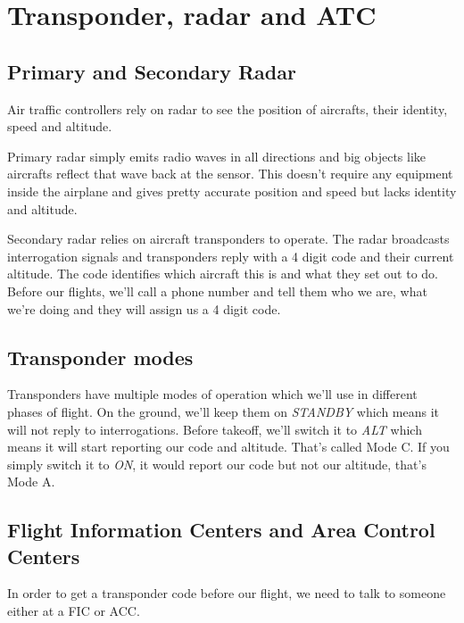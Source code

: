 \documentclass[12pt,letterpaper]{article}
\begin{document}
        
    \section{Transponder, radar and ATC}
        \subsection{Primary and Secondary Radar}
        Air traffic controllers rely on radar to see the position of aircrafts, their identity, speed and altitude.
        
        Primary radar simply emits radio waves in all directions and big objects like aircrafts reflect that wave back at the sensor. This doesn't require any equipment inside the airplane and gives pretty accurate position and speed but lacks identity and altitude.
        
        Secondary radar relies on aircraft transponders to operate. The radar broadcasts interrogation signals and transponders reply with a 4 digit code and their current altitude. The code identifies which aircraft this is and what they set out to do. Before our flights, we'll call a phone number and tell them who we are, what we're doing and they will assign us a 4 digit code.
        
        \subsection{Transponder modes}
        Transponders have multiple modes of operation which we'll use in different phases of flight. On the ground, we'll keep them on \emph{STANDBY} which means it will not reply to interrogations. Before takeoff, we'll switch it to \emph{ALT} which means it will start reporting our code and altitude. That's called Mode C. If you simply switch it to \emph{ON}, it would report our code but not our altitude, that's Mode A.
        
        \subsection{Flight Information Centers and Area Control Centers}
        In order to get a transponder code before our flight, we need to talk to someone either at a FIC or ACC.
        
\end{document}
